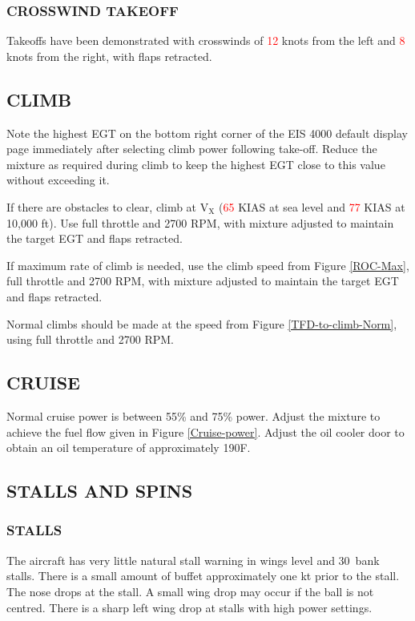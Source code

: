   \subsubsection{CROSSWIND TAKEOFF}
    Takeoffs have been demonstrated with crosswinds of \textcolor{red}{12} knots from the left and \textcolor{red}{8} knots from the right, with flaps retracted. 

\subsection{CLIMB}
Note the highest EGT on the bottom right corner of the EIS 4000 default display page immediately after selecting climb power following take-off. Reduce the mixture as required during climb to keep the highest EGT close to this value without exceeding it.

If there are obstacles to clear, climb at $\mathrm{V_{X}}$ (\textcolor{red}{65} KIAS at sea level and \textcolor{red}{77} KIAS at 10,000 ft). Use full throttle and 2700 RPM, with mixture adjusted to maintain the target EGT and flaps retracted.

If maximum rate of climb is needed, use the climb speed from Figure \ref{ROC-Max}, full throttle and 2700 RPM, with mixture adjusted to maintain the target EGT and flaps retracted.

Normal climbs should be made at the speed from Figure \ref{TFD-to-climb-Norm}, using full throttle and 2700 RPM.
\subsection{CRUISE}
Normal cruise power is between 55\% and 75\% power. Adjust the mixture to achieve the fuel flow given in Figure \ref{Cruise-power}. Adjust the oil cooler door to obtain an oil temperature of approximately 190\textdegree F.
\subsection{STALLS AND SPINS}

\subsubsection{STALLS} The aircraft has very little natural stall warning in wings level and 30\textdegree \ bank stalls. There is a small amount of buffet approximately one kt prior to the stall. The nose drops at the stall. A small wing drop may occur if the ball is not centred. There is a sharp left wing drop at stalls with high power settings.

